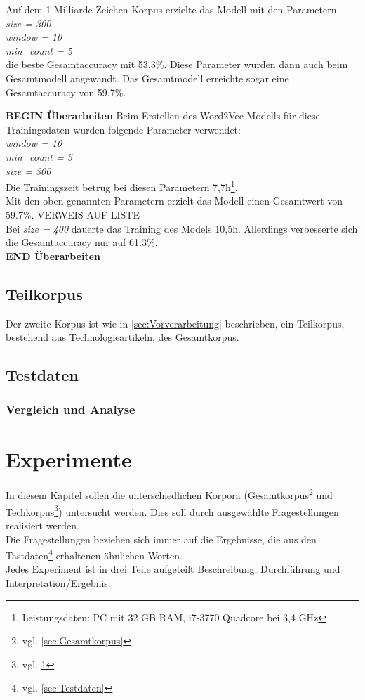 \documentclass[12pt,a4paper]{report}
\begin{document}
Auf dem 1 Milliarde Zeichen Korpus erzielte das Modell mit den Parametern \textit{\\size = 300\\ window = 10\\ min\_count = 5\\} die beste Gesamtaccuracy mit 53.3\%. Diese Parameter wurden dann auch beim Gesamtmodell angewandt. Das Gesamtmodell erreichte sogar eine Gesamtaccuracy von 59.7\%.

\textbf{BEGIN Überarbeiten}
\label{tab:VergleichParameter}
Beim Erstellen des Word2Vec Modells für diese Trainingsdaten wurden folgende Parameter verwendet:\\
\textit{window = 10}\\
\textit{min\_count = 5}\\
\textit{size = 300}\\
Die Trainingszeit betrug bei diesen Parametern 7,7h\footnote{Leistungsdaten: PC mit 32 GB RAM, i7-3770 Quadcore bei 3,4 GHz}.\\

Mit den oben genannten Parametern erzielt das Modell einen Gesamtwert von 59.7\%. VERWEIS AUF LISTE\\
		Bei \textit{size = 400} dauerte das Training des Models 10,5h. Allerdings verbesserte sich die Gesamtaccuracy nur auf 61.3\%. \\
	
\textbf{END Überarbeiten	}
	
	\section{Teilkorpus}
	\label{sec:Teilkorpus}	
	Der zweite Korpus ist wie in \ref{sec:Vorverarbeitung} beschrieben, ein Teilkorpus, bestehend aus Technologieartikeln, des Gesamtkorpus. 
	
	\section{Testdaten}
	
	
	\subsection{Vergleich und Analyse}
\newpage
\chapter{Experimente}
In diesem Kapitel sollen die unterschiedlichen Korpora (Gesamtkorpus\footnote{vgl. \ref{sec:Gesamtkorpus}} und Techkorpus\footnote{vgl. \ref{sec:Teilkorpus}}) untersucht werden. Dies soll durch ausgewählte Fragestellungen realisiert werden.
\\Die Fragestellungen beziehen sich immer auf die Ergebnisse, die aus den Tastdaten\footnote{vgl. \ref{sec:Testdaten}} erhaltenen ähnlichen Worten.
\\Jedes Experiment ist in drei Teile aufgeteilt Beschreibung, Durchführung und Interpretation/Ergebnis.
\end{document}

